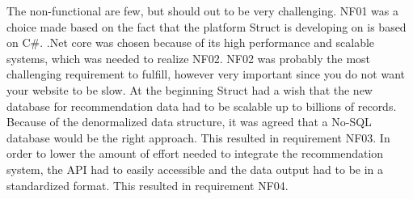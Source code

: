 The non-functional are few, but should out to be very challenging. NF01 was a choice made based on the fact that the platform Struct is developing on is based on C\#. .Net core was chosen because of its high performance and scalable systems, which was needed to realize NF02.\cite{NetCore}
NF02 was probably the most challenging requirement to fulfill, however very important since you do not want your website to be slow. At the beginning Struct had a wish that the new database for recommendation data had to be scalable up to billions of records. Because of the denormalized data structure, it was agreed that a No-SQL database would be the right approach. This resulted in requirement NF03. In order to lower the amount of effort needed to integrate the recommendation system, the API had to easily accessible and the data output had to be in a standardized format. This resulted in requirement NF04.
